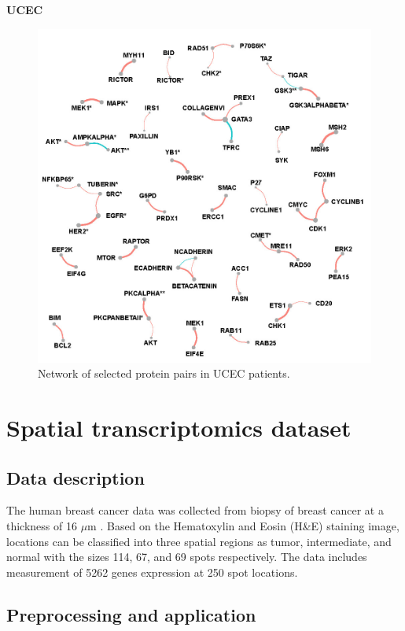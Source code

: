 \documentclass[
]{book}
\begin{document}
\textbf{UCEC}

\begin{figure}

{\centering \includegraphics[width=0.7\linewidth]{images/pan_fullnet_ucec} 

}

\caption{Network of selected protein pairs in UCEC patients.}\label{fig:ucecfullnet}
\end{figure}

\hypertarget{ST}{%
\chapter{Spatial transcriptomics dataset}\label{ST}}

\hypertarget{STdata}{%
\section{Data description}\label{STdata}}

The human breast cancer data was collected from biopsy of breast cancer at a thickness of 16 \(\mu\)m \citep{staahl2016visualization}. Based on the Hematoxylin and Eosin (H\&E) staining image, locations can be classified into three spatial regions as tumor, intermediate, and normal with the sizes 114, 67, and 69 spots respectively. The data includes measurement of 5262 genes expression at 250 spot locations.

\hypertarget{STprocess}{%
\section{Preprocessing and application}\label{STprocess}}
\end{document}
